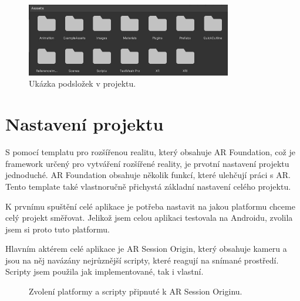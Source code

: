 \documentclass[12pt, a4paper,
twoside,        %
openright
]{report}
\begin{document}
	
	
		\begin{figure}[h!]
		\centering 
		\includegraphics[width=0.8\textwidth]{image/assets.jpg} 
		\caption{Ukázka podsložek v projektu.} 
		\label{fig:podslozky} 
	\end{figure}
	
	
	
	\newpage
	
\section{Nastavení projektu}
\label{sec:nastaveni_projektu}
S pomocí templatu pro rozšířenou realitu, který obsahuje AR Foundation, což je framework určený pro vytváření rozšířené reality, je prvotní nastavení projektu jednoduché. AR Foundation obsahuje několik funkcí, které ulehčují práci s AR. Tento template také vlastnoručně přichystá základní nastavení celého projektu. 

K prvnímu spuštění celé aplikace je potřeba nastavit na jakou platformu chceme celý projekt směřovat. Jelikož jsem celou aplikaci testovala na Androidu, zvolila jsem si proto tuto platformu.

Hlavním aktérem celé aplikace je AR Session Origin, který obsahuje kameru a jsou na něj navázány nejrůznější scripty, které reagují na snímané prostředí. Scripty jsem použila jak implementované, tak i vlastní.

\begin{figure}[h!]
	\centering
	\qquad
	\caption{Zvolení platformy a scripty připnuté k AR Session Originu.}
	\label{fig:nastaveni_unity}
\end{figure}
\end{document}
